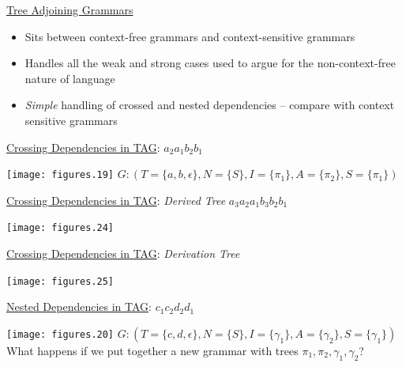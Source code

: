 \documentclass[landscape]{slides}
\begin{document}
\begin{slide}{\underline{Tree Adjoining Grammars}}
\begin{itemize}
\item Sits between context-free grammars and context-sensitive grammars
\item Handles all the weak and strong cases used to argue for the
non-context-free nature of language
\item {\em Simple} handling of crossed and nested dependencies --
compare with context sensitive grammars
\end{itemize}
\end{slide}

\begin{slide}{\underline{Crossing Dependencies in TAG}: $a_2 a_1 b_2 b_1$}
\begin{center}
\texttt{[image: figures.19]}
$G: ( T = \{a, b, \epsilon\}, N = \{ S \}, I = \{ \pi_1 \}, A = \{ \pi_2 \}, S = \{ \pi_1 \}  )$
\end{center}
\end{slide}

\begin{slide}{\underline{Crossing Dependencies in TAG}: \textit{Derived Tree} $a_3 a_2 a_1 b_3 b_2 b_1$}
\begin{center}
\texttt{[image: figures.24]}
\end{center}
\end{slide}

\begin{slide}{\underline{Crossing Dependencies in TAG}: \textit{Derivation Tree}}
\begin{center}
\texttt{[image: figures.25]}
\end{center}
\end{slide}

\begin{slide}{\underline{Nested Dependencies in TAG}: $c_1 c_2 d_2 d_1$}
\begin{center}
\texttt{[image: figures.20]}
$G: ( T = \{c, d, \epsilon\}, N = \{ S \}, I = \{ \gamma_1 \}, A = \{ \gamma_2 \}, S = \{ \gamma_1 \}  )$\\
What happens if we put together a new grammar with trees $\pi_1, \pi_2, \gamma_1, \gamma_2$?
\end{center}
\end{slide}
\end{document}
